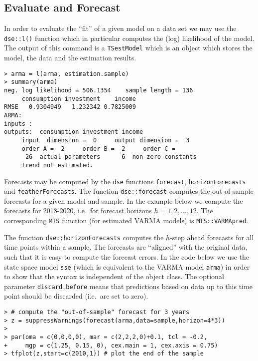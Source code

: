 \documentclass[]{article}
\begin{document}
\subsection{Evaluate and Forecast}\label{evaluate-and-forecast}

In order to evaluate the ``fit'' of a given model on a data set we may
use the \texttt{dse::l()} function which in particular computes the
(log) likelihood of the model. The output of this command is a
\texttt{TSestModel} which is an object which stores the model, the data
and the estimation results.

\begin{verbatim}
> arma = l(arma, estimation.sample)
> summary(arma)
neg. log likelihood = 506.1354    sample length = 136 
     consumption investment    income
RMSE   0.9304949   1.232342 0.7825009
ARMA:  
inputs :  
outputs:  consumption investment income 
     input  dimension =  0     output dimension =  3 
     order A =  2     order B =  2     order C =   
      26  actual parameters      6  non-zero constants
     trend not estimated.
\end{verbatim}

Forecasts may be computed by the \texttt{dse} functions
\texttt{forecast}, \texttt{horizonForecasts} and
\texttt{featherForecasts}. The function \texttt{dse::forecast} computes
the out-of-sample forecasts for a given model and sample. In the example
below we compute the forecasts for 2018-2020, i.e.~for forecast horizons
\(h=1,2,\ldots,12\). The corresponding \texttt{MTS} function (for
estimated VARMA models) is \texttt{MTS::VARMApred}.

The function \texttt{dse::horizonForecasts} computes the \(h\)-step
ahead forecasts for all time points within a sample. The forecasts are
``aligned'' with the original data, such that it is easy to compute the
forecast errors. In the code below we use the state space model
\texttt{sse} (which is equivalent to the VARMA model \texttt{arma}) in
order to show that the syntax is independent of the object class. The
optional parameter \texttt{discard.before} means that predictions based
on data up to this time point should be discarded (i.e.~are set to
zero).

\begin{verbatim}
> # compute the "out-of-sample" forecast for 3 years 
> z = suppressWarnings(forecast(arma,data=sample,horizon=4*3)) 
> 
> par(oma = c(0,0,0,0), mar = c(2,2,2,0)+0.1, tcl = -0.2, 
+     mgp = c(1.25, 0.15, 0), cex.main = 1, cex.axis = 0.75)
> tfplot(z,start=c(2010,1)) # plot the end of the sample
\end{verbatim}
\end{document}
